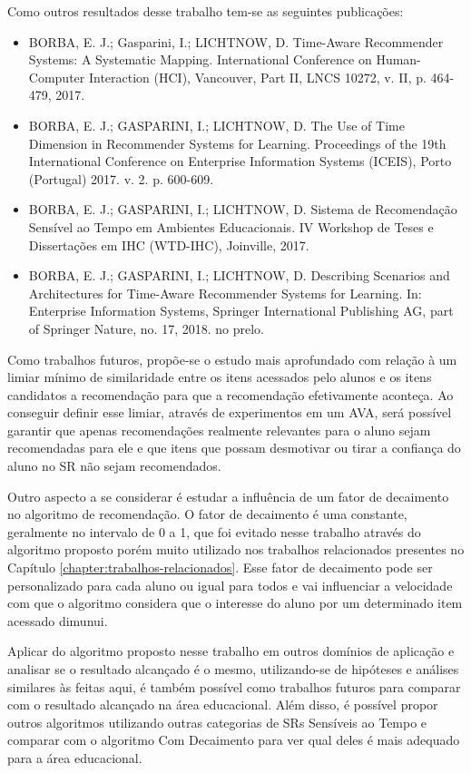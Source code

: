 Como outros resultados desse trabalho tem-se as seguintes publicações:

\begin{itemize}
\item BORBA, E. J.; Gasparini, I.; LICHTNOW, D. Time-Aware Recommender Systems: A Systematic Mapping. International Conference on Human-Computer Interaction (HCI), Vancouver, Part II, LNCS 10272, v. II, p. 464-479, 2017.
\item BORBA, E. J.; GASPARINI, I.; LICHTNOW, D. The Use of Time Dimension in Recommender Systems for Learning. Proceedings of the 19th International Conference on Enterprise Information Systems (ICEIS), Porto (Portugal) 2017. v. 2. p. 600-609.
\item BORBA, E. J.; GASPARINI, I.; LICHTNOW, D. Sistema de Recomendação Sensível ao Tempo em Ambientes Educacionais. IV Workshop de Teses e Dissertações em IHC (WTD-IHC), Joinville, 2017.
\item BORBA, E. J.; GASPARINI, I.; LICHTNOW, D. Describing Scenarios and Architectures for Time-Aware Recommender Systems for Learning. In: Enterprise Information Systems, Springer International Publishing AG, part of Springer Nature, no. 17, 2018. no prelo.
\end{itemize}

Como trabalhos futuros, propõe-se o estudo mais aprofundado com relação à um limiar mínimo de similaridade entre os itens
acessados pelo alunos e os itens candidatos a recomendação para que a recomendação efetivamente aconteça. Ao conseguir
definir esse limiar, através de experimentos em um AVA, será possível garantir que apenas recomendações realmente relevantes
para o aluno sejam recomendadas para ele e que itens que possam desmotivar ou tirar a confiança do aluno no SR não
sejam recomendados.

Outro aspecto a se considerar é estudar a influência de um fator de decaimento no algoritmo de recomendação. O fator de
decaimento é uma constante, geralmente no intervalo de 0 a 1, que foi evitado nesse trabalho através do algoritmo proposto
porém muito utilizado nos trabalhos relacionados presentes no Capítulo \ref{chapter:trabalhos-relacionados}. Esse
fator de decaimento pode ser personalizado para cada aluno ou igual para todos e vai influenciar a velocidade com que o
algoritmo considera que o interesse do aluno por um determinado item acessado dimunui.

Aplicar do algoritmo proposto nesse trabalho em outros domínios de aplicação e analisar se o resultado alcançado é o mesmo,
utilizando-se de hipóteses e análises similares às feitas aqui, é também possível como trabalhos futuros para comparar
com o resultado alcançado na área educacional. Além disso, é possível propor outros algoritmos utilizando outras categorias
de SRs Sensíveis ao Tempo e comparar com o algoritmo Com Decaimento para ver qual deles é mais adequado para a área educacional.
